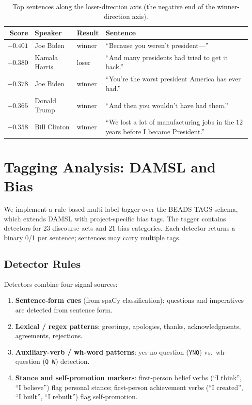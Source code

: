 \documentclass[journal]{IEEEtran}
\begin{document}
\begin{table}[!t]
\caption{Top sentences along the loser-direction axis (the negative
end of the winner-direction axis).}
\label{tab:emb_loser}
\centering
\small
\begin{tabular}{rllp{}}
\toprule
Score & Speaker & Result & Sentence \\
\midrule
$-0.401$ & Joe Biden       & winner & ``Because you weren't president---'' \\
$-0.380$ & Kamala Harris   & loser  & ``And many presidents had tried to get it back.'' \\
$-0.378$ & Joe Biden       & winner & ``You're the worst president America has ever had.'' \\
$-0.365$ & Donald Trump    & winner & ``And then you wouldn't have had them.'' \\
$-0.358$ & Bill Clinton    & winner & ``We lost a lot of manufacturing jobs in the $12$ years before I became President.'' \\
\bottomrule
\end{tabular}
\end{table}

\section{Tagging Analysis: DAMSL and Bias}
\label{sec:tagging}

We implement a rule-based multi-label tagger over the BEADS-TAGS
schema, which extends DAMSL \cite{core1997damsl} with
project-specific bias tags. The tagger contains detectors for $23$
discourse acts and $21$ bias categories. Each detector returns a
binary 0/1 per sentence; sentences may carry multiple tags.

\subsection{Detector Rules}
Detectors combine four signal sources:

\begin{enumerate}
  \item \textbf{Sentence-form cues} (from spaCy classification):
        questions and imperatives are detected from sentence form.
  \item \textbf{Lexical / regex patterns}: greetings, apologies,
        thanks, acknowledgments, agreements, rejections.
  \item \textbf{Auxiliary-verb / wh-word patterns}: yes-no question
        (\texttt{YNQ}) vs.\ wh-question (\texttt{Q\_W}) detection.
  \item \textbf{Stance and self-promotion markers}: first-person
        belief verbs (``I think'', ``I believe'') flag
        personal stance; first-person achievement verbs
        (``I created'', ``I built'', ``I rebuilt'') flag self-promotion.
\end{enumerate}
\end{document}
